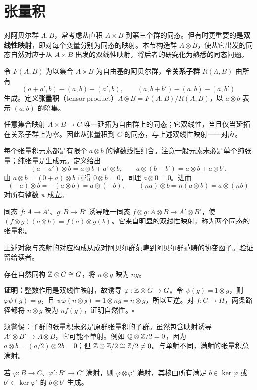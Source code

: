 \section{张量积}
对阿贝尔群 $A,B$，常考虑从直积 $A\times B$ 到第三个群的同态。但有时更重要的是\textbf{双线性映射}，即对每个变量分别为同态的映射。本节构造群 $A\otimes B$，使从它出发的同态自然对应于从 $A\times B$ 出发的双线性映射，将后者的研究化为熟悉的同态问题。

令 $F(A,B)$ 为以集合 $A\times B$ 为自由基的阿贝尔群，令\textbf{关系子群} $R(A,B)$ 由所有
\[
(a+a',b)-(a,b)-(a',b),\qquad(a,b+b')-(a,b)-(a,b')
\]
生成。定义\textbf{张量积}（tensor product）$A\otimes B=F(A,B)/R(A,B)$，以 $a\otimes b$ 表示 $(a,b)$ 的陪集。

任意集合映射 $A\times B\to C$ 唯一延拓为自由群上的同态；它双线性，当且仅当延拓在关系子群上为零。因此从张量积到 $C$ 的同态，与上述双线性映射一一对应。

每个张量积元素都是有限个 $a\otimes b$ 的整数线性组合。注意一般元素未必是单个纯张量；纯张量是生成元。定义给出
\[
(a+a')\otimes b=a\otimes b+a'\otimes b,\qquad
a\otimes(b+b')=a\otimes b+a\otimes b'.
\]
由 $a\otimes b=(0+a)\otimes b$ 可得 $0\otimes b=0$，同理 $a\otimes0=0$。进而
\[
(-a)\otimes b=-(a\otimes b)=a\otimes(-b),\qquad
(na)\otimes b=n(a\otimes b)=a\otimes(nb)
\]
对所有整数 $n$ 成立。

同态 $f:A\to A'$、$g:B\to B'$ 诱导唯一同态 $f\otimes g:A\otimes B\to A'\otimes B'$，使 $(f\otimes g)(a\otimes b)=f(a)\otimes g(b)$。它来自明显的双线性映射，称为两个同态的张量积。

上述对象与态射的对应构成从成对阿贝尔群范畴到阿贝尔群范畴的协变函子。验证留给读者。

存在自然同构 $\mathbb{Z}\otimes G\cong G$，将 $n\otimes g$ 映为 $ng$。

\textbf{证明：}整数作用是双线性映射，故诱导 $\varphi:\mathbb{Z}\otimes G\to G$。令 $\psi(g)=1\otimes g$，则 $\varphi\psi(g)=g$，且 $\psi\varphi(n\otimes g)=1\otimes ng=n\otimes g$，所以互逆。对 $f:G\to H$，两条路径都将 $n\otimes g$ 映为 $nf(g)$，证明自然性。\hfill$\square$

须警惕：子群的张量积未必是原群张量积的子群。虽然包含映射诱导 $A'\otimes B'\to A\otimes B$，它可能不单射。例如 $\mathbb Q\otimes\mathbb{Z}/2=0$，因为 $a\otimes b=(a/2)\otimes2b=0$；但 $\mathbb{Z}\otimes\mathbb{Z}/2\cong\mathbb{Z}/2\ne0$。与单射不同，满射的张量积总满射。

若 $\varphi:B\to C$、$\varphi':B'\to C'$ 满射，则 $\varphi\otimes\varphi'$ 满射，其核由所有满足 $b\in\ker\varphi$ 或 $b'\in\ker\varphi'$ 的 $b\otimes b'$ 生成。

